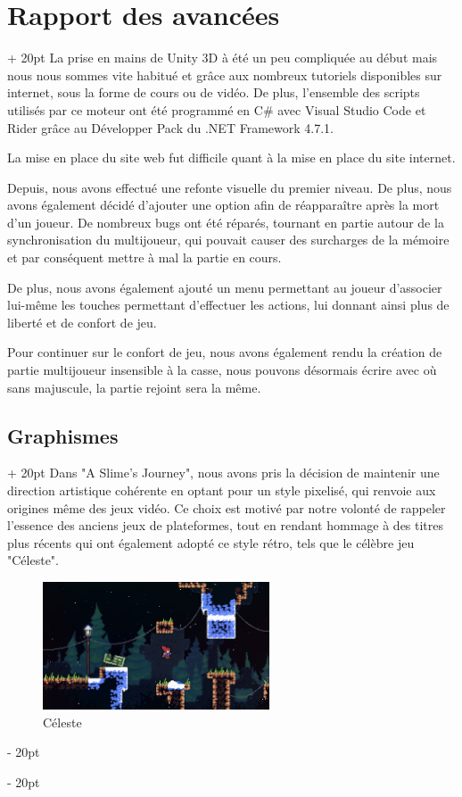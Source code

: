 \documentclass[a4paper, 12pt, twoside]{article}
\newcommand{\ind}[1][20pt]{\advance\leftskip + #1}
\newcommand{\deind}[1][20pt]{\advance\leftskip - #1}
\newenvironment{indt}[2][20pt]{#2 \par \ind[#1]}{\par \deind} %
\begin{document}
    \begin{indt}{\section{Rapport des avancées}}
        La prise en mains de Unity 3D à été un peu compliquée au début mais nous nous sommes vite habitué et grâce aux nombreux tutoriels disponibles sur internet, sous la forme de cours ou de vidéo. De plus, l'ensemble des scripts utilisés par ce moteur ont été programmé en C$\#$ avec Visual Studio Code et Rider grâce au Développer Pack du .NET Framework 4.7.1.

        La mise en place du site web fut difficile quant à la mise en place du site internet.

        Depuis, nous avons effectué une refonte visuelle du premier niveau. De plus, nous avons également décidé d’ajouter une option afin de réapparaître après la mort d’un joueur. De nombreux bugs ont été réparés, tournant en partie autour de la synchronisation du multijoueur, qui pouvait causer des surcharges de la mémoire et par conséquent mettre à mal la partie en cours.

        De plus, nous avons également ajouté un menu permettant au joueur d'associer lui-même les touches permettant d’effectuer les actions, lui donnant ainsi plus de liberté et de confort de jeu.

        Pour continuer sur le confort de jeu, nous avons également rendu la création de partie multijoueur insensible à la casse, nous pouvons désormais écrire avec où sans majuscule, la partie rejoint sera la même.

        \newpage

        \begin{indt}{\subsection{Graphismes}}
            Dans "A Slime's Journey", nous avons pris la décision de maintenir une direction artistique cohérente en optant pour un style pixelisé, qui renvoie aux origines même des jeux vidéo. Ce choix est motivé par notre volonté de rappeler l'essence des anciens jeux de plateformes, tout en rendant hommage à des titres plus récents qui ont également adopté ce style rétro, tels que le célèbre jeu "Céleste".

            \begin{figure}[h]
                \centering
                \includegraphics[width=0.6\textwidth]{Celeste.png}
                \caption{Céleste}
                \label{fig:mesh1}
            \end{figure}


\end{indt}
\end{indt}
\end{document}
